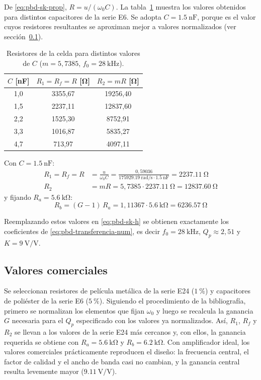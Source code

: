 De \eqref{eq:pbd-sk-prop}, $R = u / (\omega_0 C)$. La tabla~\ref{tab:pbd-barrido-c} muestra los valores obtenidos
para distintos capacitores de la serie E6. Se adopta $C = \SI{1.5}{\nano\farad}$, porque es el valor cuyos resistores
resultantes se aproximan mejor a valores normalizados (ver sección~\ref{subsec:pbd-comerciales}).

\begin{table}[!ht]
  \centering
  \begin{tabular}{|c|c|c|}
    \hline
    $C$ [\si{\nano\farad}] & $R_1 = R_f = R$ [\si{\ohm}] & $R_2 = m R$ [\si{\ohm}] \\
    \hline
    1,0 & 3355,67 & 19256,40 \\
    1,5 & 2237,11 & 12837,60 \\
    2,2 & 1525,30 & 8752,91 \\
    3,3 & 1016,87 & 5835,27 \\
    4,7 & 713,97 & 4097,11 \\
    \hline
  \end{tabular}
  \caption{Resistores de la celda para distintos valores de $C$ ($m = 5{,}7385$, $f_0 = \SI{28}{\kilo\hertz}$).}
  \label{tab:pbd-barrido-c}
\end{table}

Con $C = \SI{1.5}{\nano\farad}$:
\begin{align*}
  R_1 = R_f = R &= \frac{u}{\omega_0 C} = \frac{0{,}59036}{\SI{175929.19}{\radian/\second} \cdot
    \SI{1.5}{\nano\farad}} = \SI{2237.11}{\ohm} \\
  R_2 &= m R = 5{,}7385 \cdot \SI{2237.11}{\ohm} = \SI{12837.60}{\ohm}
\end{align*}
y fijando $R_a = \SI{5.6}{\kilo\ohm}$:
\begin{equation}
  R_b = (G - 1)\,R_a = 1{,}11367 \cdot \SI{5.6}{\kilo\ohm} = \SI{6236.57}{\ohm}
\end{equation}

Reemplazando estos valores en \eqref{eq:pbd-sk-h} se obtienen exactamente los coeficientes de
\eqref{eq:pbd-transferencia-num}, es decir $f_0 = \SI{28}{\kilo\hertz}$, $Q_p \approx 2{,}51$ y
$K = \SI{9}{\volt/\volt}$.

\subsection{Valores comerciales}
\label{subsec:pbd-comerciales}

Se seleccionan resistores de película metálica de la serie E24 ($\SI{1}{\percent}$) y capacitores de poliéster de la
serie E6 ($\SI{5}{\percent}$). Siguiendo el procedimiento de la bibliografía, primero se normalizan los elementos que
fijan $\omega_0$ y luego se recalcula la ganancia $G$ necesaria para el $Q_p$ especificado con los valores ya
normalizados. Así, $R_1$, $R_f$ y $R_2$ se llevan a los valores de la serie E24 más cercanos y, con ellos, la ganancia
requerida se obtiene con $R_a = \SI{5.6}{\kilo\ohm}$ y $R_b = \SI{6.2}{\kilo\ohm}$. Con amplificador ideal, los
valores comerciales prácticamente reproducen el diseño: la frecuencia central, el factor de calidad y el ancho de
banda casi no cambian, y la ganancia central resulta levemente mayor ($\SI{9.11}{\volt/\volt}$).

